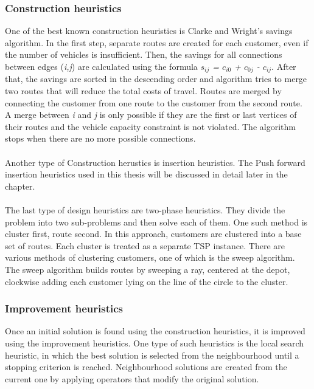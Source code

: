 \documentclass[a4paper,twoside,12pt]{book}
\begin{document}
\subsubsection{Construction heuristics}
One of the best known construction heuristics is Clarke and Wright's savings algorithm. In the first step, separate routes are created for each customer, even if the number of vehicles is insufficient. Then, the  savings for all connections between edges (\textit{i,j}) are calculated using the formula \textit{$s_{ij}$ = $c_{i0}$ + $c_{0j}$ - $c_{ij}$}. After that, the savings are sorted in the descending order and algorithm tries to merge two routes that will reduce the total costs of travel. Routes are merged by connecting the customer from one route to the customer from the second route. A merge between \textit{i} and \textit{j} is only possible if they are the first or last vertices of their routes and the vehicle capacity constraint is not violated. The algorithm stops when there are no more possible connections.
\paragraph{}
Another type of Construction herustics is insertion heuristics. The Push forward insertion heuristics used in this thesis will be discussed in detail later in the chapter.
\paragraph{}
The last type of design heuristics are two-phase heuristics. They divide the problem into two sub-problems and then solve each of them. One such method is cluster first, route second. In this approach, customers are clustered into a base set of routes. Each cluster is treated as a separate TSP instance. There are various methods of clustering customers, one of which is the sweep algorithm. The sweep algorithm builds routes by sweeping a ray, centered at the depot, clockwise adding each customer lying on the line of the circle to the cluster.
\subsubsection{Improvement heuristics}
Once an initial solution is found using the construction heuristics, it is improved using the improvement heuristics. One type of such heuristics is the local search heuristic, in which the best solution is selected from the neighbourhood until a stopping criterion is reached. Neighbourhood solutions are created from the current one by applying operators that modify the original solution. 
\end{document}
